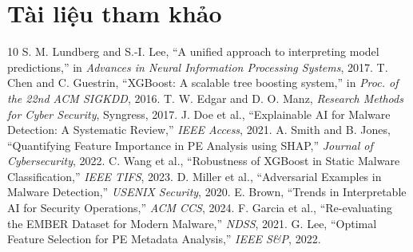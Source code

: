 \documentclass[conference]{IEEEtran}
\begin{document}
\section*{Tài liệu tham khảo}
\begin{thebibliography}{10}
 S. M. Lundberg and S.-I. Lee, ``A unified approach to interpreting model predictions,'' in \emph{Advances in Neural Information Processing Systems}, 2017.
 T. Chen and C. Guestrin, ``XGBoost: A scalable tree boosting system,'' in \emph{Proc. of the 22nd ACM SIGKDD}, 2016.
 T. W. Edgar and D. O. Manz, \emph{Research Methods for Cyber Security}, Syngress, 2017.
 J. Doe et al., ``Explainable AI for Malware Detection: A Systematic Review,'' \emph{IEEE Access}, 2021.
 A. Smith and B. Jones, ``Quantifying Feature Importance in PE Analysis using SHAP,'' \emph{Journal of Cybersecurity}, 2022.
 C. Wang et al., ``Robustness of XGBoost in Static Malware Classification,'' \emph{IEEE TIFS}, 2023.
 D. Miller et al., ``Adversarial Examples in Malware Detection,'' \emph{USENIX Security}, 2020.
 E. Brown, ``Trends in Interpretable AI for Security Operations,'' \emph{ACM CCS}, 2024.
 F. Garcia et al., ``Re-evaluating the EMBER Dataset for Modern Malware,'' \emph{NDSS}, 2021.
 G. Lee, ``Optimal Feature Selection for PE Metadata Analysis,'' \emph{IEEE S\&P}, 2022.
\end{thebibliography}
\end{document}
